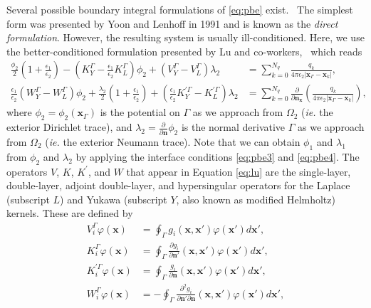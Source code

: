 Several possible boundary integral formulations of \eqref{eq:pbe} exist.~\cite{search2022towards} The simplest form was presented by Yoon and Lenhoff in 1991\cite{YoonLenhoff1990} and is known as the \emph{direct formulation}. However, the resulting system is usually ill-conditioned. Here, we use the better-conditioned formulation presented by Lu and co-workers,~\cite{LuETal2006,LuETal2009,debuhr2016dashmm} which reads
%
\begin{align}\label{eq:lu}
    \tfrac{\phi_2}{2}\left(1+\tfrac{\epsilon_1}{\epsilon_2}\right) - \left(K_Y^\Gamma - \tfrac{\epsilon_1}{\epsilon_2}K_L^\Gamma\right)\phi_2 + \left(V_Y^\Gamma - V_L^\Gamma\right)\lambda_2 &= \sum_{k=0}^{N_q}  \frac{q_k}{4\pi\epsilon_2|\mathbf{x}_{\Gamma} - \mathbf{x}_k|},
     \nonumber \\
    \tfrac{\epsilon_1}{\epsilon_2}\left(W_Y^\Gamma - W_L^\Gamma\right)\phi_2 +  \tfrac{\lambda_2}{2}\left(1+\tfrac{\epsilon_1}{\epsilon_2}\right) + \left(\tfrac{\epsilon_1}{\epsilon_2}K_Y^{\prime\Gamma} - K_L^{\prime\Gamma}\right)\lambda_2 &= \sum_{k=0}^{N_q}  \frac{\partial}{\partial\mathbf{n}_\mathbf{x}}\left(\frac{q_k}{4\pi\epsilon_2|\mathbf{x}_{\Gamma} - \mathbf{x}_k|}\right),
\end{align}
where $\phi_2 = \phi_2(\mathbf{x}_\Gamma)$ is the potential on $\Gamma$ as we approach from $\Omega_2$ ({\it ie.} the exterior Dirichlet trace),
and $\lambda_2 = \frac{\partial}{\partial \mathbf{n}}\phi_2$ is the normal derivative $\Gamma$ as we approach from $\Omega_2$ ({\it ie.} the exterior Neumann trace).
Note that we can obtain $\phi_1$ and $\lambda_1$ from $\phi_2$ and $\lambda_2$ by applying the interface conditions \eqref{eq:pbe3} and \eqref{eq:pbe4}.
The operators $V$, $K$, $K^{\prime}$, and $W$ that appear in Equation \eqref{eq:lu} are the single-layer, double-layer, adjoint double-layer, and hypersingular operators for the Laplace (subscript $L$) and Yukawa (subscript $Y$, also known as modified Helmholtz) kernels. These are defined %
by
%
\begin{align}\label{eq:all_op}
V_i^\Gamma \varphi (\mathbf{x}) &= \oint_\Gamma g_i(\mathbf{x},\mathbf{x}')\varphi(\mathbf{x}')d\mathbf{x}',\nonumber\\
K_i^\Gamma \varphi (\mathbf{x}) &= \oint_\Gamma \frac{\partial g_i}{\partial\mathbf{n}'}(\mathbf{x},\mathbf{x}')\varphi(\mathbf{x}')d\mathbf{x}',\nonumber\\
K^{\prime\Gamma}_i\varphi (\mathbf{x}) &= \oint_\Gamma \frac{g_i}{\partial\mathbf{n}}(\mathbf{x},\mathbf{x}')\varphi(\mathbf{x}')d\mathbf{x}',\nonumber\\
W^\Gamma_i\varphi (\mathbf{x}) &= - \oint_\Gamma \frac{\partial^2 g_i}{\partial\mathbf{n}'\partial\mathbf{n}}(\mathbf{x},\mathbf{x}')\varphi(\mathbf{x}')d\mathbf{x}',
\end{align}
